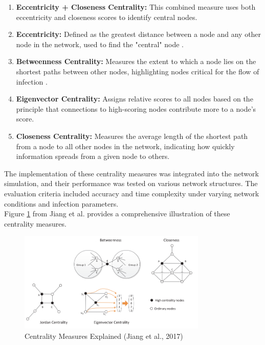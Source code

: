 \begin{enumerate}
    \item \textbf{Eccentricity + Closeness Centrality:} This combined measure uses both eccentricity and closeness scores to identify central nodes. 
    \item \textbf{Eccentricity:} Defined as the greatest distance between a node and any other node in the network, used to find the "central" node \cite{newman2010}.
    \item \textbf{Betweenness Centrality:} Measures the extent to which a node lies on the shortest paths between other nodes, highlighting nodes critical for the flow of infection \cite{girvan2002}.
    \item \textbf{Eigenvector Centrality:} Assigns relative scores to all nodes based on the principle that connections to high-scoring nodes contribute more to a node's score.
    \item \textbf{Closeness Centrality:} Measures the average length of the shortest path from a node to all other nodes in the network, indicating how quickly information spreads from a given node to others.
\end{enumerate}

The implementation of these centrality measures was integrated into the network simulation, and their performance was tested on various network structures. The evaluation criteria included accuracy and time complexity under varying network conditions and infection parameters.\\

Figure \ref{fig:centrality_measures_explained} from Jiang et al. \cite{jiang2017} provides a comprehensive illustration of these centrality measures.

\begin{figure}[H]
    \centering
    \includegraphics[width=0.8\textwidth]{centrality_measures.png}
    \caption{Centrality Measures Explained (Jiang et al., 2017)}
    \label{fig:centrality_measures_explained}
\end{figure}

